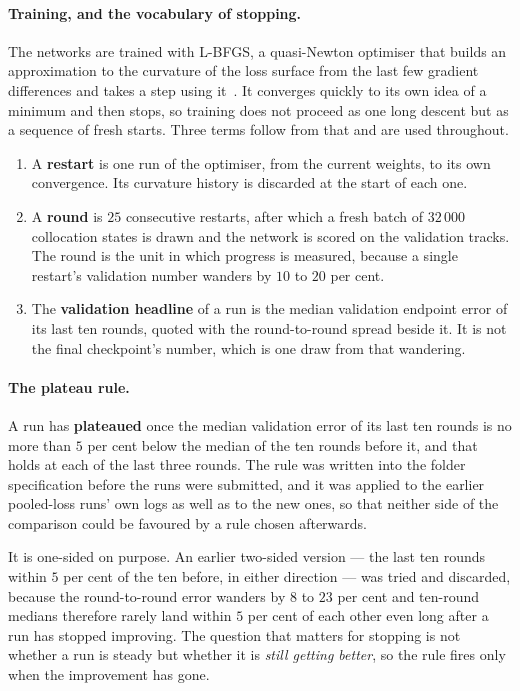 \documentclass[11pt,a4paper]{article}
\begin{document}
\paragraph{Training, and the vocabulary of stopping.} The networks are trained
with L-BFGS, a quasi-Newton optimiser that builds an approximation to the
curvature of the loss surface from the last few gradient differences and takes
a step using it~\citep{liu1989}. It converges quickly to its own idea of a
minimum and then stops, so training does not proceed as one long descent but as
a sequence of fresh starts. Three terms follow from that and are used
throughout.

\begin{enumerate}
  \item A \textbf{restart} is one run of the optimiser, from the current
  weights, to its own convergence. Its curvature history is discarded at the
  start of each one.
  \item A \textbf{round} is $25$ consecutive restarts, after which a fresh
  batch of $32\,000$ collocation states is drawn and the network is scored on
  the validation tracks. The round is the unit in which progress is measured,
  because a single restart's validation number wanders by $10$ to $20$ per
  cent.
  \item The \textbf{validation headline} of a run is the median validation
  endpoint error of its last ten rounds, quoted with the round-to-round spread
  beside it. It is not the final checkpoint's number, which is one draw from
  that wandering.
\end{enumerate}

\paragraph{The plateau rule.} A run has \textbf{plateaued} once the median
validation error of its last ten rounds is no more than $5$ per cent below the
median of the ten rounds before it, and that holds at each of the last three
rounds. The rule was written into the folder specification before the runs were
submitted, and it was applied to the earlier pooled-loss runs' own logs as well
as to the new ones, so that neither side of the comparison could be favoured by
a rule chosen afterwards.

It is one-sided on purpose. An earlier two-sided version --- the last ten
rounds within $5$ per cent of the ten before, in either direction --- was tried
and discarded, because the round-to-round error wanders by $8$ to $23$ per cent
and ten-round medians therefore rarely land within $5$ per cent of each other
even long after a run has stopped improving. The question that matters for
stopping is not whether a run is steady but whether it is \emph{still getting
better}, so the rule fires only when the improvement has gone.
\end{document}
